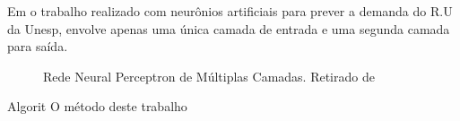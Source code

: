 \documentclass[	12pt, Times, openright, twoside, a4paper, english, brazil]{abntex2}
\begin{document}
          Em \cite{Rocha2011} o trabalho realizado com neurônios artificiais para prever a demanda do R.U da Unesp, envolve apenas uma única camada de entrada e uma segunda camada para saída. 
          \begin{figure}[!ht]
          	\caption{Rede Neural Perceptron de Múltiplas Camadas. Retirado de  \cite{Rocha2011} \label{fig:rnaRocha}}
          \end{figure}
          Algorit
          O método deste trabalho

\end{document}
